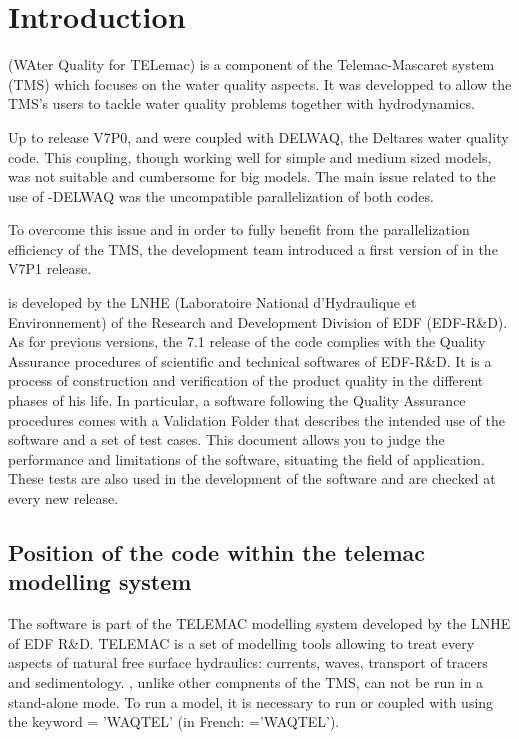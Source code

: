 \chapter{Introduction}

\waqtel (WAter Quality for TELemac) is a component of the Telemac-Mascaret system (TMS)
which focuses on the water quality aspects.
It was developped to allow the TMS's users to tackle water quality problems
together with hydrodynamics.

Up to release V7P0,  and  were coupled with DELWAQ,
the Deltares water quality code.
This coupling, though working well for simple and medium sized models,
was not suitable and cumbersome for big models.
The main issue related to the use of \telemac-DELWAQ was
the uncompatible parallelization of both codes.

To overcome this issue and in order to fully benefit
from the parallelization efficiency of the TMS, the development team
introduced a first version of \waqtel in the V7P1 release. 

\waqtel is developed by the LNHE (Laboratoire National d'Hydraulique et
Environnement) of the Research and Development Division of EDF (EDF-R\&D). As
for previous versions, the 7.1 release of the code complies with the Quality
Assurance procedures of scientific and technical softwares of EDF-R\&D. It is a
process of construction and verification of the product quality in the
different phases of his life. In particular, a software following the Quality
Assurance procedures comes with a Validation Folder that describes the intended
use of the software and a set of test cases. This document allows you to judge
the performance and limitations of the software, situating the field of
application. These tests are also used in the development of the software and are
checked at every new release.

\section{Position of the \waqtel code within the telemac modelling system}

The \waqtel software is part of the TELEMAC modelling system developed by
the LNHE of EDF R\&D. TELEMAC is a set of modelling tools allowing to treat
every aspects of natural free surface hydraulics: currents, waves, transport of
tracers and sedimentology.
\newline
\waqtel, unlike other compnents of the TMS, can not be run in a stand-alone mode.
To run a \waqtel model, it is necessary to run  or  coupled 
with \waqtel using the keyword  = 'WAQTEL'
(in French:  ='WAQTEL').

